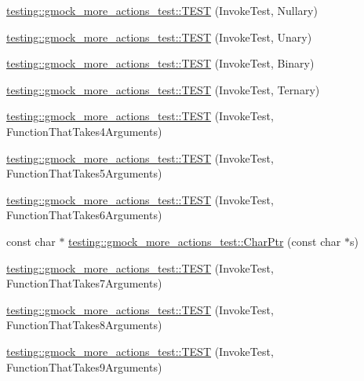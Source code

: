 \begin{DoxyCompactItemize}
\item 
\mbox{\hyperlink{namespacetesting_1_1gmock__more__actions__test_a9c5fbd26c6cc6ed31aed5bafb2fa8e5c}{testing\+::gmock\+\_\+more\+\_\+actions\+\_\+test\+::\+T\+E\+ST}} (Invoke\+Test, Nullary)
\item 
\mbox{\hyperlink{namespacetesting_1_1gmock__more__actions__test_a28b57a9f9d38574b7c033988ad528ddd}{testing\+::gmock\+\_\+more\+\_\+actions\+\_\+test\+::\+T\+E\+ST}} (Invoke\+Test, Unary)
\item 
\mbox{\hyperlink{namespacetesting_1_1gmock__more__actions__test_a906bd5cc7aa38e2cc861a9732481fce7}{testing\+::gmock\+\_\+more\+\_\+actions\+\_\+test\+::\+T\+E\+ST}} (Invoke\+Test, Binary)
\item 
\mbox{\hyperlink{namespacetesting_1_1gmock__more__actions__test_a424fb6113c6c1ab2157edf854a4ae9fe}{testing\+::gmock\+\_\+more\+\_\+actions\+\_\+test\+::\+T\+E\+ST}} (Invoke\+Test, Ternary)
\item 
\mbox{\hyperlink{namespacetesting_1_1gmock__more__actions__test_a17f41c1f7f180371d4d240089cdff0dd}{testing\+::gmock\+\_\+more\+\_\+actions\+\_\+test\+::\+T\+E\+ST}} (Invoke\+Test, Function\+That\+Takes4\+Arguments)
\item 
\mbox{\hyperlink{namespacetesting_1_1gmock__more__actions__test_a3b6b1b682295a1d04d57374445359e94}{testing\+::gmock\+\_\+more\+\_\+actions\+\_\+test\+::\+T\+E\+ST}} (Invoke\+Test, Function\+That\+Takes5\+Arguments)
\item 
\mbox{\hyperlink{namespacetesting_1_1gmock__more__actions__test_a9a6c89b83ba253838d05d7ee5da7d954}{testing\+::gmock\+\_\+more\+\_\+actions\+\_\+test\+::\+T\+E\+ST}} (Invoke\+Test, Function\+That\+Takes6\+Arguments)
\item 
const char $\ast$ \mbox{\hyperlink{namespacetesting_1_1gmock__more__actions__test_aa19ac39aaa785adeb8d7837d58b824f3}{testing\+::gmock\+\_\+more\+\_\+actions\+\_\+test\+::\+Char\+Ptr}} (const char $\ast$s)
\item 
\mbox{\hyperlink{namespacetesting_1_1gmock__more__actions__test_af4756ff87444dc6deb438a350ab5527f}{testing\+::gmock\+\_\+more\+\_\+actions\+\_\+test\+::\+T\+E\+ST}} (Invoke\+Test, Function\+That\+Takes7\+Arguments)
\item 
\mbox{\hyperlink{namespacetesting_1_1gmock__more__actions__test_a48d99224a323afa3c9772a868dd60214}{testing\+::gmock\+\_\+more\+\_\+actions\+\_\+test\+::\+T\+E\+ST}} (Invoke\+Test, Function\+That\+Takes8\+Arguments)
\item 
\mbox{\hyperlink{namespacetesting_1_1gmock__more__actions__test_a65d674aacb46d8bf79dbdfe0d49df442}{testing\+::gmock\+\_\+more\+\_\+actions\+\_\+test\+::\+T\+E\+ST}} (Invoke\+Test, Function\+That\+Takes9\+Arguments)

\end{DoxyCompactItemize}

